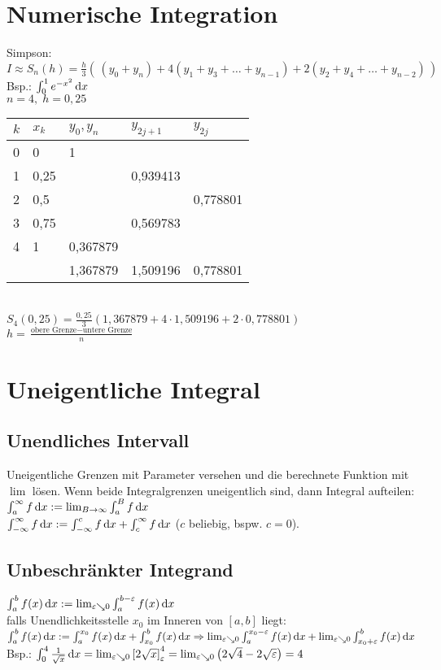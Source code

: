 \section{Numerische Integration}
Simpson:\\
$I \approx S_n(h)=\frac{h}{3}\left(\,(y_0+y_n)+4(y_1+y_3+\dots+y_{n-1})+2(y_2+y_4+\dots+y_{n-2})\,\right)$\\
Bsp.: $\int_0^1 e^{-x^2}\,\mathrm{d}x$\\
$n=4, \; h=0,25$\\
\begin{tabular}{l l l l l}
$k$ & $x_k$ & $y_0, y_n$ & $y_{2j+1}$ & $y_{2j}$\\
\hline
0 & 0		& 1	&\\
1 & 0,25& 	&0,939413\\
2 & 0,5	&		&					& 0,778801\\
3 & 0,75&		&0,569783\\
4 & 1		& 0,367879\\
\hline 
 & &		1,367879 & 1,509196 & 0,778801
\end{tabular}\\
$S_4(0,25)=\frac{0,25}{3}\left(1,367879 + 4\cdot 1,509196 + 2\cdot 0,778801\right)$\\
$h=\frac{\text{obere Grenze}-\text{untere Grenze}}{n}$

\section{Uneigentliche Integral}
\subsection{Unendliches Intervall}
Uneigentliche Grenzen mit Parameter versehen und die berechnete Funktion mit $\lim$ lösen. Wenn beide Integralgrenzen uneigentlich sind, dann Integral aufteilen:\\
$\int_a^{\infty} f \,\mathrm{d}x := \lim_{B \to \infty} \int_a^{B} f \,\mathrm{d}x$\\
$\int_{-\infty}^{\infty} f \,\mathrm{d}x := \int_{-\infty}^c f \,\mathrm{d}x + \int_c^{\infty} f \,\mathrm{d}x$ ($c$ beliebig, bspw. $c=0$).
\subsection{Unbeschränkter Integrand}
$\int_a^b f(x) \,\mathrm{d}x := \lim_{\varepsilon \searrow 0} \int_a^{b-\varepsilon} f(x) \,\mathrm{d}x$\\
falls Unendlichkeitsstelle $x_0$ im Inneren von $[a,b]$ liegt:\\
$\int_a^b f(x) \,\mathrm{d}x := \int_a^{x_0} f(x) \,\mathrm{d}x + \int_{x_0}^b f(x) \,\mathrm{d}x \Rightarrow \lim_{\varepsilon\searrow 0} \int_a^{x_0-\varepsilon} f(x) \,\mathrm{d}x + \lim_{\varepsilon\searrow 0} \int_{x_0 + \varepsilon}^b f(x) \,\mathrm{d}x$\\
Bsp.: $\int_0^4 \frac{1}{\sqrt{x}}\,\mathrm{d}x = \lim_{\varepsilon\searrow0} \left[2\sqrt{x}\right]_{\varepsilon}^4 = \lim_{\varepsilon \searrow 0} \left( 2 \sqrt{4}-2 \sqrt{\varepsilon}\right) = 4$
